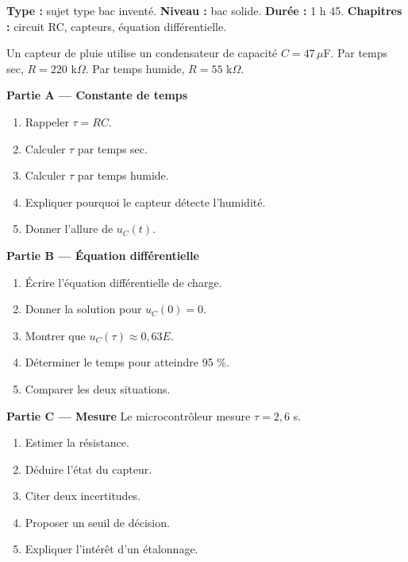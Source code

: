 \documentclass[11pt,a4paper]{article}
\begin{document}
\hypertarget{PC-LONG-04}{}
\begin{sujettype}
\textbf{Type :} sujet type bac inventé.  
\textbf{Niveau :} bac solide.  
\textbf{Durée :} 1 h 45.  
\textbf{Chapitres :} circuit RC, capteurs, équation différentielle.

Un capteur de pluie utilise un condensateur de capacité $C=47\,\mu$F. Par temps sec, $R=220$ k$\Omega$. Par temps humide, $R=55$ k$\Omega$.

\textbf{Partie A — Constante de temps}
\begin{enumerate}
  \item Rappeler $\tau=RC$.
  \item Calculer $\tau$ par temps sec.
  \item Calculer $\tau$ par temps humide.
  \item Expliquer pourquoi le capteur détecte l'humidité.
  \item Donner l'allure de $u_C(t)$.
\end{enumerate}

\textbf{Partie B — Équation différentielle}
\begin{enumerate}
  \item Écrire l'équation différentielle de charge.
  \item Donner la solution pour $u_C(0)=0$.
  \item Montrer que $u_C(\tau)\approx0{,}63E$.
  \item Déterminer le temps pour atteindre 95 \%.
  \item Comparer les deux situations.
\end{enumerate}

\textbf{Partie C — Mesure}
Le microcontrôleur mesure $\tau=2{,}6$ s.
\begin{enumerate}
  \item Estimer la résistance.
  \item Déduire l'état du capteur.
  \item Citer deux incertitudes.
  \item Proposer un seuil de décision.
  \item Expliquer l'intérêt d'un étalonnage.
\end{enumerate}
\end{sujettype}
\end{document}
